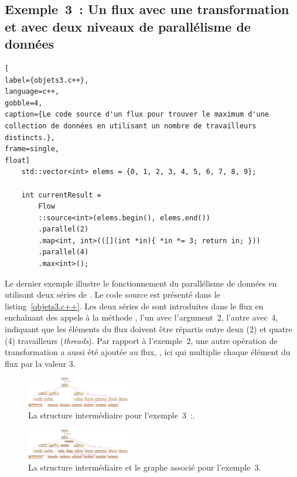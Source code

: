 \subsection{Exemple~3~: Un flux avec une transformation et avec deux niveaux de parallélisme de données}


\begin{lstlisting}[
label={objets3.c++},
language=c++,
gobble=4,
caption={Le code source d'un flux pour trouver le maximum d'une collection de données en utilisant un nombre de travailleurs distincts.},
frame=single,
float]
    std::vector<int> elems = {0, 1, 2, 3, 4, 5, 6, 7, 8, 9};

    int currentResult =
        Flow
        ::source<int>(elems.begin(), elems.end())
        .parallel(2)
        .map<int, int>(([](int *in){ *in *= 3; return in; }))
        .parallel(4)
        .max<int>();
\end{lstlisting}

Le dernier exemple illustre le fonctionnement du parallélisme de données en utilisant deux s\'eries de . Le code source est présenté dans le listing~\ref{objets3.c++}. Les deux s\'eries de  sont introduites dans le flux en encha\^inant des appels à la m\'ethode , l'un avec l'argument~2, l'autre avec~4, indiquant que les \'el\'ements du flux doivent être r\'epartis entre deux (2) et quatre (4) travailleurs (\emph{threads}). Par rapport à l'exemple~2, une autre opération de transformation a aussi \'et\'e ajout\'ee au flux, , ici qui multiplie chaque \'el\'ement du flux par la valeur 3.



\begin{figure}
\centering
         \includegraphics[angle=90,width=0.4\textwidth]{Figures/objets3-ppff.png}
      \caption[La structure interm\'ediaire  pour l'exemple~3.]{La structure interm\'ediaire  pour 
         l'exemple~3~:.}
       \label{objets3-ppff.fig}
\end{figure}       


\begin{figure}
\centering
         \includegraphics[angle=90,width=0.4\textwidth]{Figures/objets3-ff.png}
      \caption{La structure interm\'ediaire  et le graphe  associ\'e pour l'exemple~3.}
       \label{objets3-ff.fig}
\end{figure}



